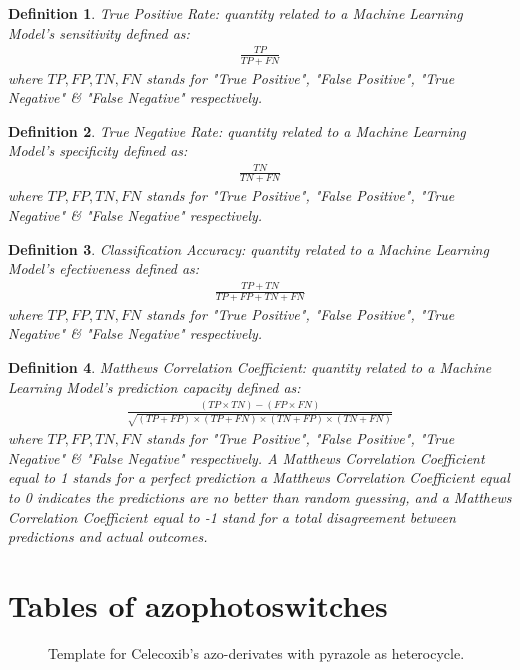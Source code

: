 \documentclass[11pt]{article}
\newtheorem{definition}{Definition}
\begin{document}
\begin{definition}\label{definitionTruePositiveRate}
True Positive Rate: quantity related to a Machine Learning Model's sensitivity defined as:
\begin{align}
\frac{TP}{TP+FN}
\end{align}
where $TP,FP,TN,FN$ stands for "True Positive", "False Positive", "True Negative" \& "False Negative" respectively.
\end{definition}

\begin{definition}\label{definitionTrueNegativeRate}
True Negative Rate: quantity related to a Machine Learning Model's specificity defined as:
\begin{align}
\frac{TN}{TN+FN}
\end{align}
where $TP,FP,TN,FN$ stands for "True Positive", "False Positive", "True Negative" \& "False Negative" respectively.
\end{definition}

\begin{definition}\label{definitionClassificationAccuracy}
Classification Accuracy: quantity related to a Machine Learning Model's efectiveness defined as:
\begin{align}
\frac{TP+TN}{TP+FP+TN+FN}
\end{align}
where $TP,FP,TN,FN$ stands for "True Positive", "False Positive", "True Negative" \& "False Negative" respectively.
\end{definition}

\begin{definition}\label{definitionMatthewsCorrelationCoeficient}
Matthews Correlation Coefficient: quantity related to a Machine Learning Model's prediction capacity defined as:
{\scriptsize
\begin{align}
\frac{(TP\times TN)-(FP\times FN)}{\sqrt{(TP+FP)\times(TP+FN)\times(TN+FP)\times(TN+FN)}}
\end{align}
}where $TP,FP,TN,FN$ stands for "True Positive", "False Positive", "True Negative" \& "False Negative" respectively.
A Matthews Correlation Coefficient equal to 1 stands for a perfect prediction a Matthews Correlation Coefficient equal to 0 indicates the predictions are no better than random guessing, and a Matthews Correlation Coefficient equal to -1 stand for a total disagreement between predictions and actual outcomes.
\end{definition}


\section{Tables of azophotoswitches}\label{appendixAzophotoshiches}
\begin{figure}[H]
\captionsetup{type=scheme}
\centering
{}
\caption{Template for Celecoxib's azo-derivates with pyrazole as heterocycle.}
\label{figureCelecoxibPyrazole}
\end{figure}
\end{document}
